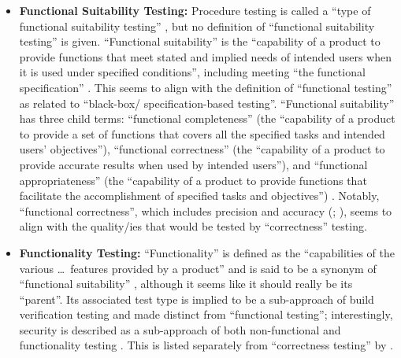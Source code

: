 \begin{itemize}
      \item \textbf{Functional Suitability Testing:} Procedure testing is
            called a ``type of functional suitability testing''
            \citep[p.~7]{IEEE2022}, but no definition of ``functional
            suitability testing'' is given. ``Functional suitability'' is the
            ``capability of a product to provide functions that meet stated and
            implied needs of intended users when it is used under specified
            conditions'', including meeting ``the functional specification''
            \citep{ISO_IEC2023a}. This seems to align with the definition of
            ``functional testing'' as related to ``black-box/
            specification-based testing''. ``Functional suitability'' has
            three child terms: ``functional completeness'' (the ``capability of
            a product to provide a set of functions that covers all the
            specified tasks and intended users' objectives''), ``functional
            correctness'' (the ``capability of a product to provide accurate
            results when used by intended users''), and ``functional
            appropriateness'' (the ``capability of a product to provide
            functions that facilitate the accomplishment of specified tasks and
            objectives'') \citep{ISO_IEC2023a}. Notably, ``functional
            correctness'', which includes precision and accuracy
            (\citealp{ISO_IEC2023a}; ), seems to align with
            the quality/ies that would be tested by ``correctness'' testing.

      \item \textbf{Functionality Testing:} ``Functionality'' is defined as the
            ``capabilities of the various \dots\ features provided by a product''
            \citep[p.~196]{IEEE2017} and is said to be a synonym of
            ``functional suitability'' , although it seems
            like it should really be its ``parent''. Its associated test type
            is implied to be a sub-approach of build verification testing
             and made distinct from ``functional testing'';
            interestingly, security is described as a sub-approach of both
            non-functional and functionality testing \citep[Tab.~2]{Gerrard2000a}.
            This is listed separately from ``correctness testing'' by
            \citet[p.~53]{Firesmith2015}.
\end{itemize}

